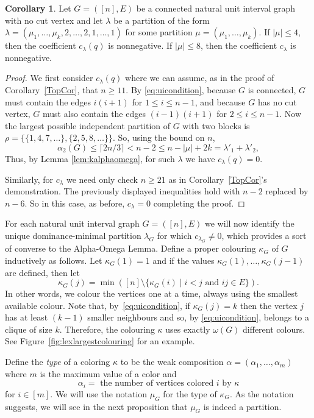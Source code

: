 \documentclass[12pt]{amsart}  %
\theoremstyle{definition}
\newtheorem{corollary}[theorem]{Corollary}
\theoremstyle{remark}
\numberwithin{equation}{section}
\newcommand{\ka}{\kappa}
\newcommand{\la}{\lambda}
\newcommand{\al}{\alpha}
\begin{document}
\begin{corollary}
Let $G=([n],E)$ be a connected natural unit interval graph with no cut vertex and let $\lambda$ be a partition of the form 
$\la=(\mu_1,\ldots,\mu_k,2,\ldots,2,1,\ldots,1)$ for some partition $\mu=(\mu_1,\ldots,\mu_k)$.
If $|\mu|\leq 4$, then the coefficient $c_\lambda(q)$ is nonnegative. If $|\mu|\leq 8$, then the coefficient $c_\lambda$ is nonnegative.
\end{corollary}

\begin{proof}
We first consider $c_\la(q)$ where we can assume, as in the proof of Corollary~\ref{TopCor}, that $n\ge11$.
By \eqref{eq:uicondition}, because $G$ is connected, $G$ must contain the edges $i(i+1)$ for $1\leq i\leq n-1$, and because $G$ has no cut vertex, $G$ must also contain the edges $(i-1)(i+1)$ for $2\leq i\leq n-1$. Now the largest possible independent partition of $G$ with two blocks is $\rho=\{\{1,4,7,\ldots\},\{2,5,8,\ldots\}\}$. So, using the bound on $n$,
$$
\alpha_2(G)\leq\lceil 2n/3 \rceil< n-2 \le n-|\mu|+2k = \lambda'_1+\lambda'_2,
$$
Thus, by Lemma \ref{lem:kalphaomega}, for such $\la$ we have  $c_\lambda(q)=0$.

Similarly, for $c_\la$ we need only check $n\ge 21$ as in Corollary~\ref{TopCor}'s demonstration.
The previously displayed inequalities hold with $n-2$ replaced by $n-6$.  So in this case, as before, $c_\la=0$ completing the proof.
\end{proof}

For each  natural unit interval graph $G=([n],E)$ we will now identify the unique dominance-minimal partition $\la_G$ for which 
$c_{\la_G}\neq 0$, which provides a sort of converse to the Alpha-Omega Lemma. 
Define a proper colouring 
$\ka_G$ of $G$ inductively as follows. Let $\ka_G(1)=1$ and if the values 
$\ka_G(1),\ldots,\ka_G(j-1)$ are defined, then let
\begin{equation}
\label{kappa}
\ka_G(j)=\min([n]\setminus\{\ka_G(i) \mid i<j \text{ and } ij\in E\}).
\end{equation}
In other words, we colour the vertices one at a time, always using the smallest available colour. Note that,
by~\eqref{eq:uicondition},
if $\ka_G(j)=k$ then the vertex $j$ has at least $(k-1)$ smaller neighbours and so, by \eqref{eq:uicondition}, belongs to a clique of size $k$. Therefore, the colouring $\kappa$ uses exactly $\omega(G)$ different colours. See Figure~\ref{fig:lexlargestcolouring} for an example.

Define the {\em type} of a coloring $\ka$ to be the weak composition 
$\al=(\al_1,\ldots,\al_m)$ where $m$ is the maximum value of a color and
$$
\al_i =\text{ the number of vertices colored $i$ by $\ka$}
$$
for $i\in[m]$.  We will use the notation $\mu_G$ for the type of $\ka_G$.  As the notation suggests, we will see in the next proposition that $\mu_G$ is indeed a partition.
\end{document}
